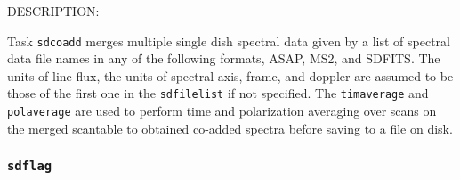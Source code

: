           DESCRIPTION:

          Task {\tt sdcoadd} merges multiple single dish spectral data given by
          a list of spectral data file names in any of the following formats,
          ASAP, MS2, and SDFITS.
          The units of line flux, the units of spectral axis, frame, and doppler
          are assumed to be those of the first one in the {\tt sdfilelist} if not
          specified.
          The {\tt timaverage} and {\tt polaverage} are used to perform time
          and polarization averaging over scans on the merged scantable to 
          obtained co-added spectra before saving to a file on disk.


\subsubsection{{\tt sdflag}}
\label{section:sd.sdtasks.tasks.sdflag}

